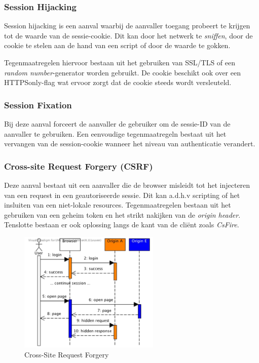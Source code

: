 \documentclass[../main.tex]{subfiles}
\begin{document}
\subsubsection{Session Hijacking}
Session hijacking is een aanval waarbij de aanvaller toegang probeert te krijgen tot de waarde van de sessie-cookie. Dit kan door het netwerk te \textit{sniffen}, door de cookie te stelen aan de hand van een script of door de waarde te gokken. 

Tegenmaatregelen hiervoor bestaan uit het gebruiken van SSL/TLS of een \textit{random number}-generator worden gebruikt. De cookie beschikt ook over een HTTPSonly-flag wat ervoor zorgt dat de cookie steeds wordt versleuteld. 

\subsubsection{Session Fixation}
Bij deze aanval forceert de aanvaller de gebruiker om de sessie-ID van de aanvaller te gebruiken. Een eenvoudige tegenmaatregeln bestaat uit het vervangen van de session-cookie wanneer het niveau van authenticatie verandert.

\subsubsection{Cross-site Request Forgery (CSRF)}
Deze aanval bestaat uit een aanvaller die de browser misleidt tot het injecteren van een request in een geautoriseerde sessie. Dit kan a.d.h.v scripting of het insluiten van een niet-lokale resources. Tegenmaatregelen bestaan uit het gebruiken van een geheim token en het strikt nakijken van de \textit{origin header}. Tenslotte bestaan er ook oplossing langs de kant van de cli\"ent zoals \textit{CsFire}.

\begin{figure}[h!]
    \centering
    \includegraphics[width=0.6\textwidth]{images/CSRF.png}
    \caption{Cross-Site Request Forgery}
    \label{fig:awesome_image}
\end{figure}
\end{document}
